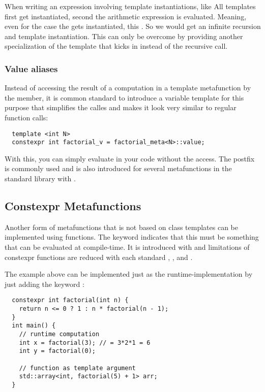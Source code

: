 \begin{rem}
  When writing an expression involving template instantiations, like
  All templates first get instantiated, second the arithmetic expression is evaluated. Meaning, even for the case  the
   gets instantiated, this . So we would get an infinite recursion and template instantiation.
  This can only be overcome by providing another specialization of the template that kicks in instead of the recursive call.
\end{rem}


\subsubsection{Value aliases}
Instead of accessing the result of a computation in a template metafunction by the  member, it is common standard to
introduce a variable template for this purpose that simplifies the calles and makes it look very similar to regular function calls:
%
\begin{verbatim}
  template <int N>
  constexpr int factorial_v = factorial_meta<N>::value;
\end{verbatim}
%
With this, you can simply evaluate  in your code without the  access. The postfix  is commonly used
and is also introduced for several metafunctions in the standard library with .


\subsection{Constexpr Metafunctions}
Another form of metafunctions that is not based on class templates can be implemented using  functions. The keyword
 indicates that this must be something that can be evaluated at compile-time. It is introduced with  and limitations
of constexpr functions are reduced with each standard , , and .

The example above can be implemented just as the runtime-implementation by just adding the keyword :
\begin{verbatim}
  constexpr int factorial(int n) {
    return n <= 0 ? 1 : n * factorial(n - 1);
  }
  int main() {
    // runtime computation
    int x = factorial(3); // = 3*2*1 = 6
    int y = factorial(0);

    // function as template argument
    std::array<int, factorial(5) + 1> arr;
  }
\end{verbatim}

